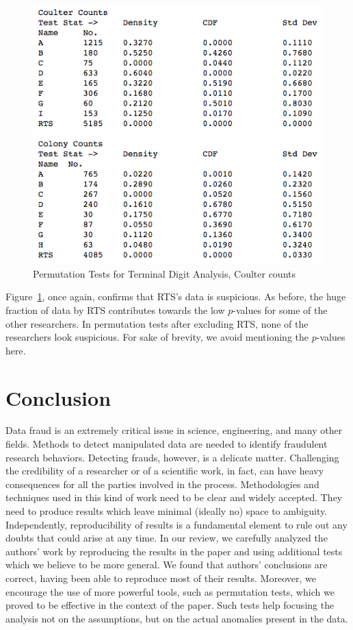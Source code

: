 \documentclass{article}
\begin{document}
\begin{figure}[H]
\centering
\includegraphics[width=0.7\linewidth]{images/raaz_eq_perm_summary.png}
\caption{Permutation Tests for Terminal Digit Analysis, Coulter counts}
\label{perm2}
\end{figure}

Figure~\ref{perm2}, once again, confirms that RTS's data is suspicious. As before, the huge fraction of data
by RTS contributes towards the low $p$-values for some of the other
researchers. In permutation tests after excluding RTS, none of the researchers look suspicious. For sake of brevity, we avoid mentioning the
$p$-values here.

    \section{Conclusion}\label{conclusion}

    Data fraud is an extremely critical issue in science, engineering, and
many other fields. Methods to detect manipulated data are needed to
identify fraudulent research behaviors. Detecting frauds, however, is a
delicate matter. Challenging the credibility of a researcher or of a
scientific work, in fact, can have heavy consequences for all the parties
involved in the process. Methodologies and techniques used in this kind
of work need to be clear and widely accepted. They need to produce
results which leave minimal (ideally no) space to ambiguity. Independently, reproducibility of results is a fundamental element to rule out any doubts that could arise at any time.
In our review, we carefully analyzed the authors' work by reproducing the results in the paper and using additional tests which we believe to be more general.
We found that authors' conclusions are correct, having been able to reproduce most of their results. 
Moreover, we encourage the use of more powerful tools, such as permutation tests, which we proved to be effective in the context of the paper. 
Such tests help focusing the analysis not on the assumptions, but on the actual anomalies present in the data.
\end{document}
